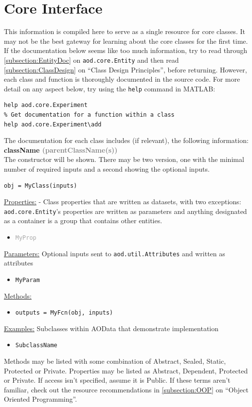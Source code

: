 \documentclass[10pt]{exam}
\newcommand\myurl[1]{\textcolor{blue}{\underline{#1}}}
\newcommand\myparent[1]{\textcolor{gray}{(#1)}}
\newcommand\aodparam[1]{\textcolor{codepurple}{\texttt{#1}}}
\newcommand\aodclass[1]{\textcolor{codeblue}{\texttt{#1}}}
\newcommand\aodprop[1]{\textcolor{darkgray}{\texttt{#1}}}
\newcommand\aodfcn[1]{\textcolor{darkteal}{\texttt{#1}}}
\newcommand\matfcn[1]{\textcolor{darkteal}{\texttt{#1}}}
\newcommand\docheader[1]{\vspace{0.6ex}\noindent\underline{#1}\vspace{0.15ex}}
\begin{document}
\section{Core Interface}
	\label{section:CoreInterface}
	\noindent This information is compiled here to serve as a single resource for core classes. It may not be the best gateway for learning about the core classes for the first time. If the documentation below seems like too much information, try to read through \myurl{\ref{subsection:EntityDoc}} on \aodclass{aod.core.Entity} and then read \myurl{\ref{subsection:ClassDesign}} on ``Class Design Principles'', before returning.  However, each class and function is thoroughly documented in the source code. For more detail on any aspect below, try using the \matfcn{help} command in MATLAB:
	\begin{lstlisting}[style=matlab-editor, basicstyle=\mlttfamily\footnotesize]
% Get documentation for a class or function
help aod.core.Experiment
% Get documentation for a function within a class
help aod.core.Experiment\add
	\end{lstlisting}
	\noindent The documentation for each class includes (if relevant), the following information:\smallskip\\
	\textbf{className \myparent{parentClassName(s)}}\smallskip\\
	The constructor will be shown. There may be two version, one with the minimal number of required inputs and a second showing the optional inputs.
	\begin{lstlisting}[style=matlab-editor, basicstyle=\mlttfamily\footnotesize]
obj = MyClass(inputs)
	\end{lstlisting}
	\docheader{Properties:} - Class properties that are written as datasets, with two exceptions: \aodclass{aod.core.Entity}'s properties are written as parameters and anything designated as a container is a group that contains other entities. %
	\begin{itemize}
		\item \aodprop{MyProp}
	\end{itemize}
	\docheader{Parameters:} Optional inputs sent to \aodclass{aod.util.Attributes} and written as attributes
	\begin{itemize}
		\item \aodparam{MyParam}
	\end{itemize}
	\docheader{Methods:}
	\begin{itemize}
		\item \aodfcn{outputs = MyFcn(obj, inputs)}
	\end{itemize}
	\docheader{Examples:} Subclasses within AOData that demonstrate implementation
	\begin{itemize}
		\item \aodclass{SubclassName}
	\end{itemize}
	\noindent Methods may be listed with some combination of Abstract, Sealed, Static, Protected or Private. Properties may be listed as Abstract, Dependent, Protected or Private. If access isn't specified, assume it is Public. If these terms aren't familiar, check out the resource recommendations in \myurl{\ref{subsection:OOP}} on ``Object Oriented Programming''.
\end{document}
